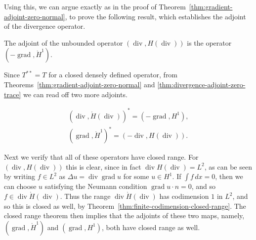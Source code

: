 {Using this, we can argue exactly as in the proof of Theorem~\ref{thm:gradient-adjoint-zero-normal}, to prove the following result, which establishes the adjoint of the divergence operator.}

\begin{Theorem}\label{thm:divergence-adjoint-zero-trace}
{The adjoint of the unbounded operator $(\operatorname{div},H(\operatorname{div}))$ is the operator $(-\operatorname{grad},\mathring H^1)$.}
\end{Theorem}

{Since $T^{**}=T$ for a closed densely defined operator, from Theorems~\ref{thm:gradient-adjoint-zero-normal} and \ref{thm:divergence-adjoint-zero-trace} we can read off two more adjoints.}

\begin{Theorem}\label{thm:reverse-gradient-divergence-adjoints}
\[
\begin{gathered}
(\operatorname{div},\mathring H(\operatorname{div}))^*=(-\operatorname{grad},H^1),\\
(\operatorname{grad},\mathring H^1)^*=(-\operatorname{div},H(\operatorname{div})).
\end{gathered}
\]
\end{Theorem}

{Next we verify that all of these operators have closed range. For $(\operatorname{div},H(\operatorname{div}))$ this is clear, since in fact $\operatorname{div}H(\operatorname{div})=L^2$, as can be seen by writing $f\in L^2$ as $\Delta u=\operatorname{div}\operatorname{grad}u$ for some $u\in H^1$. If $\int f\,dx=0$, then we can choose $u$ satisfying the Neumann condition $\operatorname{grad}u\cdot n=0$, and so $f\in\operatorname{div}\mathring H(\operatorname{div})$. Thus the range $\operatorname{div}\mathring H(\operatorname{div})$ has codimension $1$ in $L^2$, and so this is closed as well, by Theorem~\ref{thm:finite-codimension-closed-range}. The closed range theorem then implies that the adjoints of these two maps, namely, $(\operatorname{grad},\mathring H^1)$ and $(\operatorname{grad},H^1)$, both have closed range as well.}


